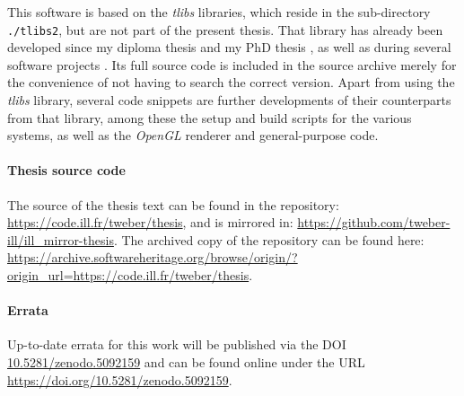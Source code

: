 This software is based on the \textit{tlibs} libraries, which reside in the 
sub-directory \lstinline|./tlibs2|, but are not part of the present thesis.
That library has already been developed since my diploma thesis \cite{DiplomaWeber} 
and my PhD thesis \cite{PhDWeber}, as well as during several software 
projects \cite{Weber2014, Takin2016, Takin2017, Takin2021}.
Its full source code is included in the source archive merely for the convenience of not
having to search the correct version.
Apart from using the \textit{tlibs} library, several code snippets are further developments
of their counterparts from that library, among these the setup and build scripts for the various
systems, as well as the \textit{OpenGL} renderer and general-purpose code.


\paragraph{Thesis source code}
The source of the thesis text can be found in the repository:
\url{https://code.ill.fr/tweber/thesis}, and is mirrored in:
\url{https://github.com/tweber-ill/ill_mirror-thesis}.
The archived copy of the repository can be found here:
\url{https://archive.softwareheritage.org/browse/origin/?origin_url=https://code.ill.fr/tweber/thesis}.


\paragraph{Errata}
Up-to-date errata for this work will be published via the DOI
\href{https://doi.org/10.5281/zenodo.5092159}{10.5281/zenodo.5092159}
and can be found online under the URL \url{https://doi.org/10.5281/zenodo.5092159}.
